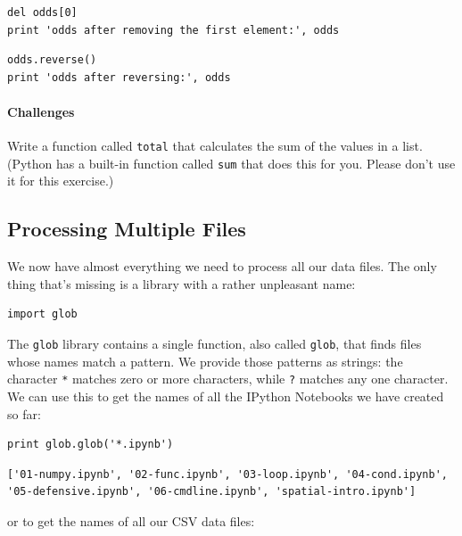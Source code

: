 \documentclass{book}
\begin{document}
\begin{verbatim}
del odds[0]
print 'odds after removing the first element:', odds
\end{verbatim}

\begin{verbatim}
odds.reverse()
print 'odds after reversing:', odds
\end{verbatim}

\mbox{}\paragraph{Challenges}

\begin{swcenumerate}
\item
  Write a function called \texttt{total} that calculates the sum of the
  values in a list. (Python has a built-in function called \texttt{sum}
  that does this for you. Please don't use it for this exercise.)
\end{swcenumerate}

\subsection{Processing Multiple Files}

We now have almost everything we need to process all our data files. The
only thing that's missing is a library with a rather unpleasant name:

\begin{verbatim}
import glob
\end{verbatim}

The \texttt{glob} library contains a single function, also called
\texttt{glob}, that finds files whose names match a pattern. We provide
those patterns as strings: the character \texttt{*} matches zero or more
characters, while \texttt{?} matches any one character. We can use this
to get the names of all the IPython Notebooks we have created so far:

\begin{verbatim}
print glob.glob('*.ipynb')
\end{verbatim}

\begin{verbatim}
['01-numpy.ipynb', '02-func.ipynb', '03-loop.ipynb', '04-cond.ipynb', '05-defensive.ipynb', '06-cmdline.ipynb', 'spatial-intro.ipynb']
\end{verbatim}

or to get the names of all our CSV data files:
\end{document}
